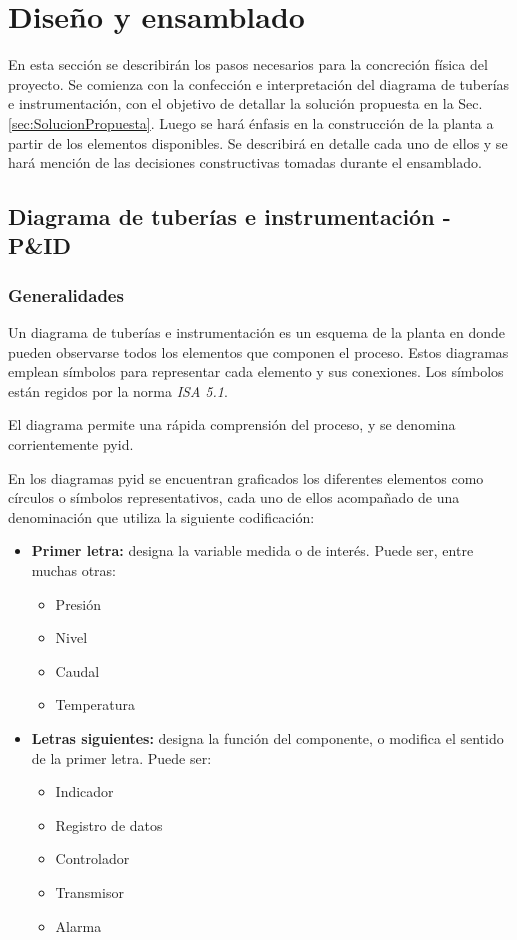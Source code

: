 \chapter{Diseño y ensamblado}
\label{ch:DisenoEnsamblado}

En esta sección se describirán los pasos necesarios para la concreción física
del proyecto.
Se comienza con la confección e interpretación del diagrama de tuberías e
instrumentación, con el objetivo de detallar la solución propuesta en
la Sec. \ref{sec:SolucionPropuesta}.
Luego se hará énfasis en la construcción de la planta a partir de los elementos
disponibles.
Se describirá en detalle cada uno de ellos y se hará mención de
las decisiones constructivas tomadas durante el ensamblado.

\section{Diagrama de tuberías e instrumentación - P\&ID}
\label{sec:p&id}

\subsection{Generalidades}
Un diagrama de tuberías e instrumentación es un esquema de la planta en donde
pueden observarse todos los elementos que componen el proceso.
Estos diagramas emplean símbolos para representar cada elemento y sus
conexiones.
Los símbolos están regidos por la norma
\emph{ISA 5.1}.

El diagrama permite una rápida comprensión del proceso, y se denomina
corrientemente \gls{pyid}.

En los diagramas \gls{pyid} se encuentran graficados los diferentes elementos
como círculos o símbolos representativos, cada uno de ellos acompañado de una
denominación que utiliza la siguiente codificación:

\begin{itemize}  
 \item \textbf{Primer letra:}
 designa la variable medida o de interés. Puede ser, entre muchas otras:
 \begin{itemize}
  \item Presión
  \item Nivel
  \item Caudal
  \item Temperatura
 \end{itemize}

 \item \textbf{Letras siguientes:}
 designa la función del componente, o modifica el sentido de la primer letra.
 Puede ser:
 \begin{itemize}
  \item Indicador
  \item Registro de datos
  \item Controlador
  \item Transmisor
  \item Alarma
 \end{itemize}
\end{itemize}

